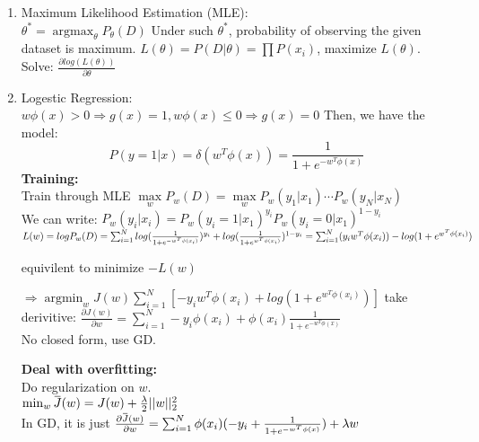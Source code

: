 \documentclass[10pt]{article}
\newcommand{\overbar}[1]{\mkern 1.5mu\overline{\mkern-1.5mu#1\mkern-1.5mu}\mkern 1.5mu}
\DeclareMathOperator*{\argmin}{\arg\min}
\DeclareMathOperator*{\argmax}{\arg\max}
\begin{document}
\begin{multicols}{2}
\begin{enumerate}
        \item Maximum Likelihood Estimation (MLE):\\
        $\theta^* = \argmax_{\theta}P_\theta(D)$ Under such $\theta^*$, probability of observing the given dataset is maximum.
        $L(\theta) = P(D|\theta) = \prod P(x_i)$, maximize $L(\theta)$. Solve: $\frac{\partial log(L(\theta))}{\partial \theta}$

        \item Logestic Regression:\\
        $w\phi(x) > 0 \Rightarrow g(x) = 1, w\phi(x) \le 0 \Rightarrow g(x) = 0$ Then, we have the model: 
        $$P(y = 1| x) = \delta(w^T\phi(x)) =\frac{1}{1 + e^{-w^T\phi(x)}}$$
        \textbf{Training:}\\
        Train through MLE $\max\limits_{w}P_w(D) = \max\limits_{w}P_w(y_1 | x_1) \cdots P_w(y_N | x_N) $\\
        We can write: $P_w(y_i|x_i) = P_w(y_i = 1 | x_1)^{y_i} P_w(y_i = 0 | x_1)^{1 - y_i}$\\
        $L(w) = logP_w(D) = \sum_{i = 1}^{N}log(\frac{1}{1 + e^{-w^T\phi(x_i)}})^{y_i} + log(\frac{1}{1 + e^{w^T\phi(x_i)}})^{1 -y_i} \\
        = \sum_{i = 1}^{N}(y_iw^T\phi(x_i)) - log(1 + e^{w^T\phi(x_i)})$ 

        equivilent to minimize $-L(w)$
        
        $\Rightarrow \argmin_w J(w) \sum_{i = 1}^{N}[-y_iw^T\phi(x_i) + log(1 + e^{w^T\phi(x_i)})]$ take derivitive:
        $\frac{\partial J(w)}{\partial w} = \sum_{i = 1}^{N} -y_i\phi(x_i) + \phi(x_i)\frac{1}{1 + e^{-w^T\phi(x)}}$\\
        No closed form, use GD.

        \textbf{Deal with overfitting:} \\
        Do regularization on $w$.\\
        $\min_w \overbar{J}(w) = J(w) + \frac{\lambda}{2}||w||^2_2$\\
        In GD, it is just $\frac{\partial \overbar{J}(w)}{\partial w} = \sum_{i = 1}^{N} \phi(x_i)(-y_i + \frac{1}{1 + e^{-w^T\phi(x)}}) + \lambda w$

    \end{enumerate}
    \newpage
\end{multicols}
\end{document}
